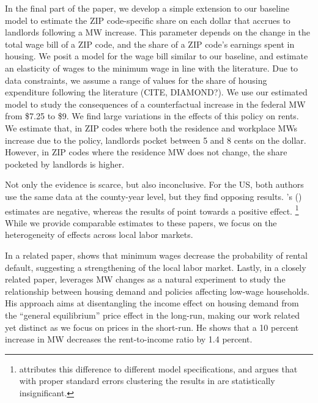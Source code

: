 
In the final part of the paper, we develop a simple extension to our baseline model
to estimate the ZIP code-specific share on each dollar that accrues to landlords
following a MW increase.
This parameter depends on the change in the total wage bill of a ZIP code, and the 
share of a ZIP code's earnings spent in housing.
We posit a model for the wage bill similar to our baseline, and estimate an elasticity
of wages to the minimum wage in line with the literature.
Due to data constraints, we assume a range of values for the share of housing
expenditure following the literature (CITE, DIAMOND?).
We use our estimated model to study the consequences of a counterfactual increase 
in the federal MW from \$7.25 to \$9.
We find large variations in the effects of this policy on rents.
We estimate that, in ZIP codes where both the residence and workplace MWs increase
due to the policy, landlords pocket between 5 and 8 cents on the dollar.
However, in ZIP codes where the residence MW does not change, the share pocketed
by landlords is higher.

Not only the evidence is scarce, but also inconclusive. For the US, both authors use the 
same data at the county-year level, but they find opposing results.
\citeauthor{Tidemann2018}'s (\citeyear{Tidemann2018}) estimates are 
negative, whereas the results of \textcite{Yamagishi2019} point towards a positive 
effect.%
\footnote{\textcite{Yamagishi2019} attributes this difference to different model 
specifications, and argues that with proper standard errors clustering the results 
in \textcite{Tidemann2018} are statistically insignificant.}
While we provide comparable estimates to these papers, we focus on the heterogeneity
of effects across local labor markets.

In a related paper, \textcite{AgarwalEtAl2019} shows that minimum wages decrease the 
probability of rental default, suggesting a strengthening of the local labor market. 
Lastly, in a closely related paper, \textcite{Hughes2020} leverages MW changes as a 
natural experiment to study the relationship between housing demand and policies 
affecting low-wage households. His approach aims at disentangling the income effect 
on housing demand from the ``general equilibrium'' price effect in the long-run, 
making our work related yet distinct as we focus on prices in the short-run. He shows 
that a 10 percent increase in MW decreases the rent-to-income ratio by 1.4 percent.

